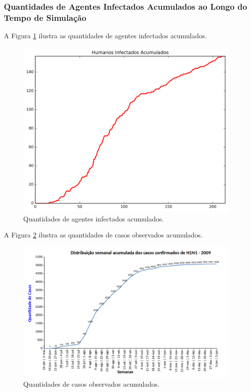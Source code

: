 \newpage

\subsubsection{Quantidades de Agentes Infectados Acumulados ao Longo do Tempo de Simulação}

A Figura \ref{fig:Quantidades_Agentes_Infectados_Acumulado_0002} ilustra as quantidades de agentes infectados acumulados.

\begin{figure}[H]
  \centering
  \includegraphics[width=1.0\textwidth]{Figuras/Resultados/0002/Saidas/MonteCarlo_0/Quantidades_Humanos_Novo_Total.png}
  \caption{Quantidades de agentes infectados acumulados.}
  \label{fig:Quantidades_Agentes_Infectados_Acumulado_0002}
\end{figure}

A Figura \ref{fig:Casos_Observados_Acumulados_0002} ilustra as quantidades de casos observados acumulados.

\begin{figure}[H]
  \centering
  \includegraphics[width=1.0\textwidth]{Figuras/Resultados/Observado/Casos_Observados_Acumulados.png}
  \caption{Quantidades de casos observados acumulados.}
  \label{fig:Casos_Observados_Acumulados_0002}
\end{figure}

